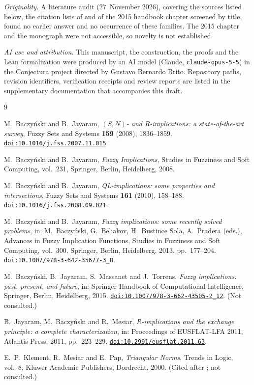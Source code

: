 \documentclass[11pt]{amsart}
\numberwithin{equation}{section}
\theoremstyle{definition}
\theoremstyle{remark}
\newcommand{\doi}[1]{\href{https://doi.org/#1}{\nolinkurl{doi:#1}}}
\begin{document}
\emph{Originality.} A literature audit (27~November 2026), covering the
sources listed below, the citation lists of \cite{BJ2008,BJ2010} and of the
2015 handbook chapter \cite{BJMT2015} screened by title, found no earlier
answer and no occurrence of these families. The 2015 chapter and the
monograph \cite{BJ2008book} were not accessible, so novelty is not
established.

\emph{AI use and attribution.} This manuscript, the construction, the proofs
and the Lean formalization were produced by an AI model (Claude,
\texttt{claude-opus-5-5}) in the Conjectura project directed by Gustavo
Bernardo Brito. Repository paths, revision identifiers, verification receipts
and review reports are listed in the supplementary documentation that
accompanies this draft.

\begin{thebibliography}{9}

M.~Baczy\'nski and B.~Jayaram, \emph{$(S,N)$- and R-implications: a
state-of-the-art survey}, Fuzzy Sets and Systems \textbf{159} (2008),
1836--1859. \doi{10.1016/j.fss.2007.11.015}.

M.~Baczy\'nski and B.~Jayaram, \emph{Fuzzy Implications}, Studies in
Fuzziness and Soft Computing, vol.~231, Springer, Berlin, Heidelberg, 2008.

M.~Baczy\'nski and B.~Jayaram, \emph{QL-implications: some properties and
intersections}, Fuzzy Sets and Systems \textbf{161} (2010), 158--188.
\doi{10.1016/j.fss.2008.09.021}.

M.~Baczy\'nski and B.~Jayaram, \emph{Fuzzy implications: some recently solved
problems}, in: M.~Baczy\'nski, G.~Beliakov, H.~Bustince Sola, A.~Pradera
(eds.), Advances in Fuzzy Implication Functions, Studies in Fuzziness and
Soft Computing, vol.~300, Springer, Berlin, Heidelberg, 2013, pp.~177--204.
\doi{10.1007/978-3-642-35677-3_8}.

M.~Baczy\'nski, B.~Jayaram, S.~Massanet and J.~Torrens, \emph{Fuzzy
implications: past, present, and future}, in: Springer Handbook of
Computational Intelligence, Springer, Berlin, Heidelberg, 2015.
\doi{10.1007/978-3-662-43505-2_12}. (Not consulted.)

B.~Jayaram, M.~Baczy\'nski and R.~Mesiar, \emph{R-implications and the
exchange principle: a complete characterization}, in: Proceedings of EUSFLAT-LFA 2011, Atlantis Press, 2011,
pp.~223--229.
\doi{10.2991/eusflat.2011.63}.

E.~P.~Klement, R.~Mesiar and E.~Pap, \emph{Triangular Norms}, Trends in Logic,
vol.~8, Kluwer Academic Publishers, Dordrecht, 2000. (Cited after
\cite{JBM2011}; not consulted.)

\end{thebibliography}
\end{document}
